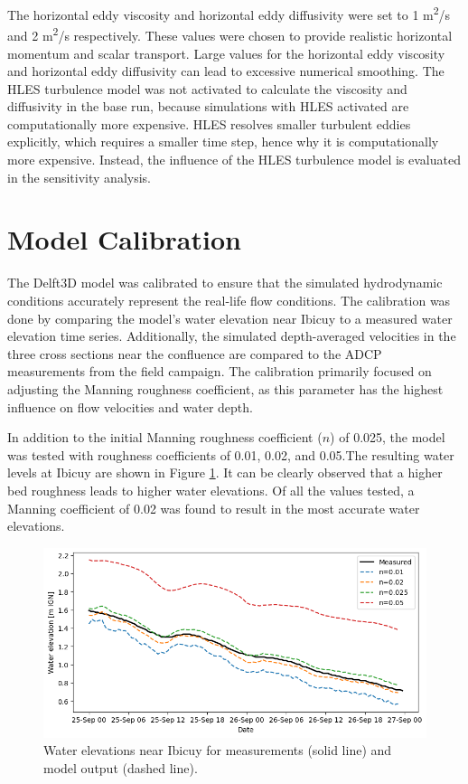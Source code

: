 The horizontal eddy viscosity and horizontal eddy diffusivity were set to 1 m\textsuperscript{2}/s and 2 m\textsuperscript{2}/s respectively. These values were chosen to provide realistic horizontal momentum and scalar transport. Large values for the horizontal eddy viscosity and horizontal eddy diffusivity can lead to excessive numerical smoothing. The HLES turbulence model was not activated to calculate the viscosity and diffusivity in the base run, because simulations with HLES activated are computationally more expensive. HLES resolves smaller turbulent eddies explicitly, which requires a smaller time step, hence why it is computationally more expensive. Instead, the influence of the HLES turbulence model is evaluated in the sensitivity analysis.

\section{Model Calibration}
The Delft3D model was calibrated to ensure that the simulated hydrodynamic conditions accurately represent the real-life flow conditions. The calibration was done by comparing the model's water elevation near Ibicuy to a measured water elevation time series. Additionally, the simulated depth-averaged velocities in the three cross sections near the confluence are compared to the ADCP measurements from the field campaign. The calibration primarily focused on adjusting the Manning roughness coefficient, as this parameter has the highest influence on flow velocities and water depth.

In addition to the initial Manning roughness coefficient ($n$) of 0.025, the model was tested with roughness coefficients of 0.01, 0.02, and 0.05.The resulting water levels at Ibicuy are shown in Figure \ref{fig: WL calibration}. It can be clearly observed that a higher bed roughness leads to higher water elevations. Of all the values tested, a Manning coefficient of 0.02 was found to result in the most accurate water elevations.

\begin{figure}[H]
    \centering
    \includegraphics[width=1\linewidth]{figures/ch7/WL_calibration.png}
    \caption{Water elevations near Ibicuy for measurements (solid line) and model output (dashed line).}
    \label{fig: WL calibration}
\end{figure}

